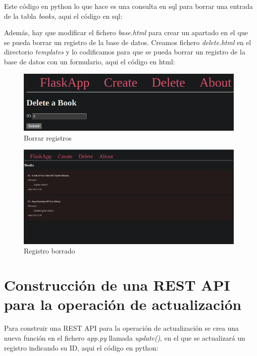 \documentclass[11pt]{report}
\begin{document}
Este código en python lo que hace es una consulta en sql para borrar una entrada de la tabla \emph{books},
aqui el código en sql:
\lstset{style=mystyle}


Además, hay que modificar el fichero \emph{base.html} para crear un apartado en el que se pueda borrar
un registro de la base de datos. Creamos fichero \emph{delete.html} en el directorio \emph{templates} y
lo codificamos para que se pueda borrar un registro de la base de datos con un formulario, aqui el código
en html:
\lstset{style=mystyle}


\begin{figure}[H]
  \centering
  \includegraphics[scale=0.27]{img/delete_book.png}
  \caption{Borrar registros}
\end{figure}

\begin{figure}[H]
  \centering
  \includegraphics[scale=0.20]{img/book_already_deleted.png}
  \caption{Registro borrado}
\end{figure}

\section{Construcción de una REST API para la operación de actualización}
Para construir una REST API para la operación de actualización se crea una nueva función en el fichero \emph{app.py}
llamada \emph{update()}, en el que se actualizará un registro indicando su ID, aqui el código en python:
\lstset{style=mystyle}

\end{document}

